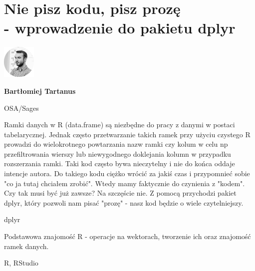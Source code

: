 \documentclass[\main/boa.tex]{subfiles}
\begin{document}
\section[Nie pisz kodu, pisz prozę - wprowadzenie do pakietu dplyr]{Nie pisz kodu, pisz prozę \\- wprowadzenie do pakietu dplyr}
\begin{minipage}[t]{0.915\textwidth}
	\center     
    \includegraphics[width=60px]{img/workshops/czarno_biale/bartek-crop.png} 
\end{minipage}

\begin{minipage}{0.915\textwidth}
\centering
{\bf {} Bartłomiej Tartanus}
\end{minipage}

\vskip 0.3cm

\begin{affiliations}
\begin{minipage}{0.915\textwidth}
\centering
\large OSA/Sages  \\[2pt]
\end{minipage}
\end{affiliations}

\vskip 0.8cm

\opiswarsztatu Ramki danych w R (data.frame) są niezbędne do pracy z danymi w postaci tabelarycznej. Jednak często przetwarzanie takich ramek przy użyciu czystego R prowadzi do wielokrotnego powtarzania nazw ramki czy kolum w celu np przefiltrowania wierszy lub niewygodnego doklejania kolumn w przypadku rozszerzania ramki. Taki kod często bywa nieczytelny i nie do końca oddaje intencje autora. Do takiego kodu ciężko wrócić za jakiś czas i przypomnieć sobie "co ja tutaj chciałem zrobić". Wtedy mamy faktycznie do czynienia z "kodem". Czy tak musi być już zawsze? Na szczęście nie. Z pomocą przychodzi pakiet dplyr, który pozwoli nam pisać "prozę" - nasz kod będzie o wiele czytelniejszy.	 

\pakiety dplyr

\umiejetnosci Podstawowa znajomość R - operacje na wektorach, tworzenie ich oraz znajomość ramek danych.

\wymagania R, RStudio
\end{document}
